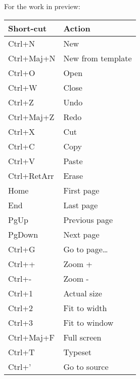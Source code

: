 For the work in preview:

\begin{longtable}{Pp{60mm}}
\textrm{Short-cut} & Action\\
\hline Ctrl+N & New\\
Ctrl+Maj+N & New from template\\
Ctrl+O & Open\\
Ctrl+W & Close\\
Ctrl+Z & Undo\\
Ctrl+Maj+Z & Redo\\
Ctrl+X & Cut\\
Ctrl+C & Copy\\
Ctrl+V & Paste\\
Ctrl+RetArr & Erase\\
Home & First page\\
End & Last page\\
PgUp & Previous page\\
PgDown & Next page\\
Ctrl+G & Go to page\dots\\
Ctrl++ & Zoom +\\
Ctrl+- & Zoom -\\
Ctrl+1 & Actual size\\
Ctrl+2 & Fit to width\\
Ctrl+3 & Fit to window\\
Ctrl+Maj+F & Full screen\\
Ctrl+T & Typeset\\
Ctrl+' & Go to source\\
\end{longtable}

